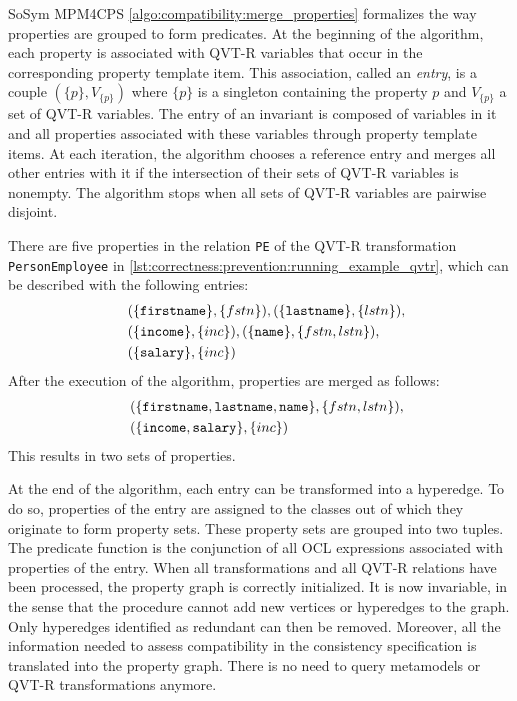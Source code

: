 \begin{copiedFrom}{SoSym MPM4CPS}
\autoref{algo:compatibility:merge_properties} formalizes the way properties are grouped to form predicates. At the beginning of the algorithm, each property is associated with QVT-R variables that occur in the corresponding property template item. This association, called an \textit{entry}, is a couple $(\{p\}, V_{\{p\}})$ where $\{p\}$ is a singleton containing the property $p$ and $V_{\{p\}}$ a set of QVT-R variables. The entry of an invariant is composed of variables in it and all properties associated with these variables through property template items. At each iteration, the algorithm chooses a reference entry and merges all other entries with it if the intersection of their sets of QVT-R variables is nonempty. The algorithm stops when all sets of QVT-R variables are pairwise disjoint.

\begin{example}
There are five properties in the relation \texttt{PE} of the QVT-R transformation \texttt{PersonEmployee} in \autoref{lst:correctness:prevention:running_example_qvtr}, which can be described with the following entries:
\begin{align*}
\hspace{1em}
&(\{\texttt{firstname}\}, \{fstn\}), (\{\texttt{lastname}\}, \{lstn\}),\\ &(\{\texttt{income}\}, \{inc\}), (\{\texttt{name}\}, \{fstn, lstn\}),\\ &(\{\texttt{salary}\}, \{inc\})
\end{align*}
After the execution of the algorithm, properties are merged as follows:
\begin{align*}
\hspace{1em}
&(\{\texttt{firstname}, \texttt{lastname}, \texttt{name}\}, \{fstn, lstn\}),\\
&(\{\texttt{income}, \texttt{salary}\}, \{inc\})
\end{align*}
This results in two sets of properties.
\end{example}

At the end of the algorithm, each entry can be transformed into a hyperedge. To do so, properties of the entry are assigned to the classes out of which they originate to form property sets. These property sets are grouped into two tuples. The predicate function is the conjunction of all OCL expressions associated with properties of the entry.
When all transformations and all QVT-R relations have been processed, the property graph is correctly initialized. It is now invariable, in the sense that the procedure cannot add new vertices or hyperedges to the graph. Only hyperedges identified as redundant can then be removed. Moreover, all the information needed to assess compatibility in the consistency specification is translated into the property graph. There is no need to query metamodels or QVT-R transformations anymore.


\end{copiedFrom}
